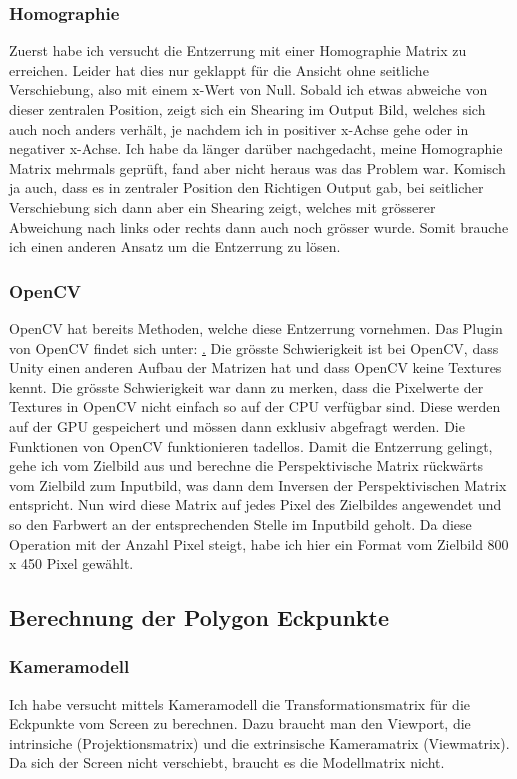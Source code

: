 \subsubsection{Homographie}
Zuerst habe ich versucht die Entzerrung mit einer Homographie Matrix zu erreichen. Leider hat dies nur geklappt für die Ansicht ohne seitliche Verschiebung, also mit einem x-Wert von Null. Sobald ich etwas abweiche von dieser zentralen Position, zeigt sich ein Shearing im Output Bild, welches sich auch noch anders verhält, je nachdem ich in positiver x-Achse gehe oder in negativer x-Achse. 
Ich habe da länger darüber nachgedacht, meine Homographie Matrix mehrmals geprüft, fand aber nicht heraus was das Problem war. Komisch ja auch, dass es in zentraler Position den Richtigen Output gab, bei seitlicher Verschiebung sich dann aber ein Shearing zeigt, welches mit grösserer Abweichung nach links oder rechts dann auch noch grösser wurde.
Somit brauche ich einen anderen Ansatz um die Entzerrung zu lösen.

\subsubsection{OpenCV}
OpenCV hat bereits Methoden, welche diese Entzerrung vornehmen. Das Plugin von OpenCV findet sich unter: \href{https://github.com/EnoxSoftware/OpenCVForUnity/tree/master/Assets/OpenCVForUnity} .
Die grösste Schwierigkeit ist bei OpenCV, dass Unity einen anderen Aufbau der Matrizen hat und dass OpenCV keine Textures kennt. 
Die grösste Schwierigkeit war dann zu merken, dass die Pixelwerte der Textures in OpenCV nicht einfach so auf der CPU verfügbar sind. Diese werden auf der GPU gespeichert und mössen dann exklusiv abgefragt werden.
Die Funktionen von OpenCV funktionieren tadellos. Damit die Entzerrung gelingt, gehe ich vom Zielbild aus und berechne die Perspektivische Matrix rückwärts vom Zielbild zum Inputbild, was dann dem Inversen der Perspektivischen Matrix entspricht. 
Nun wird diese Matrix auf jedes Pixel des Zielbildes angewendet und so den Farbwert an der entsprechenden Stelle im Inputbild geholt. 
Da diese Operation mit der Anzahl Pixel steigt, habe ich hier ein Format vom Zielbild 800 x 450 Pixel gewählt.

\subsection{Berechnung der Polygon Eckpunkte}
\subsubsection{Kameramodell}
Ich habe versucht mittels Kameramodell die Transformationsmatrix für die Eckpunkte vom Screen zu berechnen. Dazu braucht man den Viewport, die intrinsiche (Projektionsmatrix) und die extrinsische Kameramatrix (Viewmatrix). Da sich der Screen nicht verschiebt, braucht es die Modellmatrix nicht.
 

